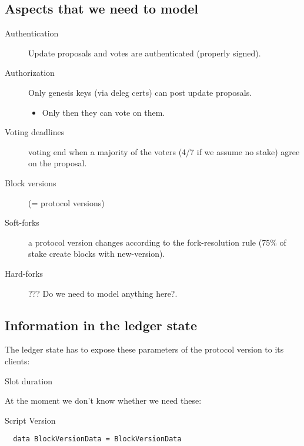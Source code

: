 
\subsection{Aspects that we need to model}
\label{sec:aspects-to-model}

\begin{description}
\item[Authentication] Update proposals and votes are authenticated (properly
  signed).
\item[Authorization] Only genesis keys (via deleg certs) can post update
  proposals.
  \begin{itemize}
  \item Only then they can vote on them.
  \end{itemize}
\item[Voting deadlines] voting end when a majority of the voters (4/7 if we
assume no stake) agree on the proposal.
\item[Block versions] (= protocol versions)
\item[Soft-forks] a protocol version changes according to the fork-resolution
  rule (75\% of stake create blocks with new-version).
\item[{Hard-forks}] ??? Do we need to model anything here?.
\end{description}

\subsection{Information in the ledger state}
\label{sec:information-in-ledger-state}

The ledger state has to expose these parameters of the protocol version to its
clients:

\begin{description}
\item[Slot duration] 
\end{description}

At the moment we don't know whether we need these:

\begin{description}
\item[Script Version] 
\end{description}



       
\begin{lstlisting}
  data BlockVersionData = BlockVersionData
\end{lstlisting}
